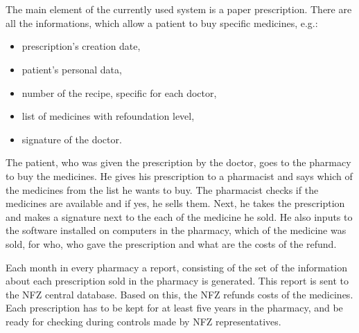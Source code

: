 \chapter{   }

The main element of the currently used system is a paper prescription. There are all the informations, which allow a patient to buy specific medicines, e.g.: 

\begin{itemize}
  \item prescription’s creation date,
  \item patient’s personal data,
  \item number of the recipe, specific for each doctor,
  \item list of medicines with refoundation level,
  \item signature of the doctor. 
\end{itemize}

The patient, who was given the prescription by the doctor, goes to the pharmacy to buy the medicines. He gives his prescription to a pharmacist and says which of the medicines from the list he wants to buy. The pharmacist checks if the medicines are available and if yes, he sells them. Next, he takes the prescription and makes a signature next to the each of the medicine he sold. He also inputs to the software installed on computers in the pharmacy, which of the medicine was sold, for who, who gave the prescription and what are the costs of the refund.

Each month in every pharmacy a report, consisting of  the set of the information about each prescription sold in the pharmacy is generated. This report is sent to the NFZ central database. Based on this, the NFZ refunds costs of the medicines. Each prescription has to be kept for at least five years in the pharmacy, and be ready for checking during controls made by NFZ representatives. 




